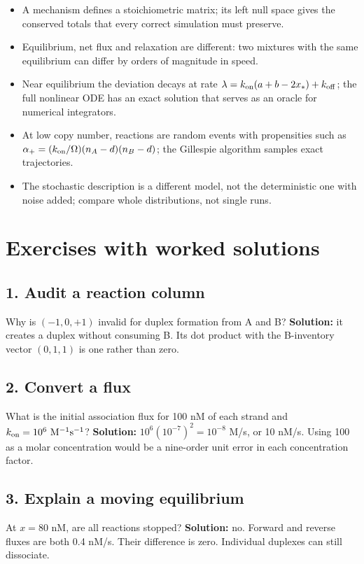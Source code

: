 \begin{KeyIdeas}
\begin{itemize}\setlength{\itemsep}{2pt}
\item A mechanism defines a stoichiometric matrix; its left null space gives the
conserved totals that every correct simulation must preserve.
\item Equilibrium, net flux and relaxation are different: two mixtures with the
same equilibrium can differ by orders of magnitude in speed.
\item Near equilibrium the deviation decays at rate
$\lambda=k_{\rm on}(a+b-2x_*)+k_{\rm off}$; the full nonlinear ODE has an exact
solution that serves as an oracle for numerical integrators.
\item At low copy number, reactions are random events with propensities such as
$\alpha_+=(k_{\rm on}/\Omega)(n_A-d)(n_B-d)$; the Gillespie algorithm samples exact
trajectories.
\item The stochastic description is a different model, not the deterministic one
with noise added; compare whole distributions, not single runs.
\end{itemize}
\end{KeyIdeas}

\section{Exercises with worked solutions}

\subsection*{1. Audit a reaction column}
Why is $(-1,0,+1)$ invalid for duplex formation from A and B?
\textbf{Solution:} it creates a duplex without consuming B. Its dot
product with the B-inventory vector $(0,1,1)$ is one rather than zero.

\subsection*{2. Convert a flux}
What is the initial association flux for 100 nM of each strand and
$k_{\rm on}=10^6\ \mathrm{M}^{-1}\mathrm{s}^{-1}$?
\textbf{Solution:} $10^6(10^{-7})^2=10^{-8}$ M/s, or 10 nM/s.
Using 100 as a molar concentration would be a nine-order unit error
in each concentration factor.

\subsection*{3. Explain a moving equilibrium}
At $x=80$ nM, are all reactions stopped?
\textbf{Solution:} no. Forward and reverse fluxes are both 0.4 nM/s.
Their difference is zero. Individual duplexes can still dissociate.

